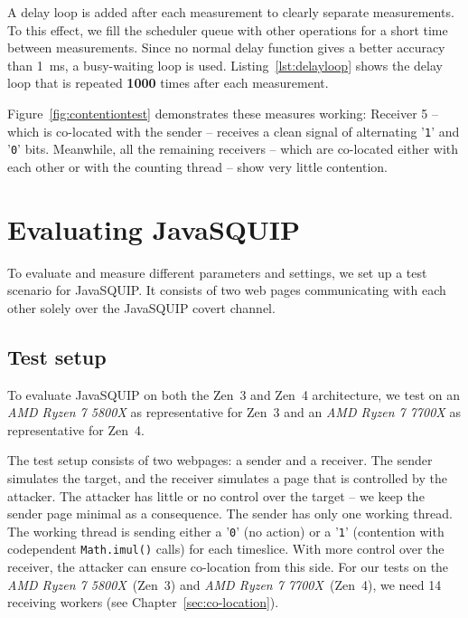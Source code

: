 \documentclass[11pt,
  titlepage=false,
  parskip=half,      %
]{scrreprt}
\begin{document}
A delay loop is added after each measurement to clearly separate measurements.
To this effect, we fill the scheduler queue with other operations for a short time between measurements.
Since no normal delay function gives a better accuracy than 1~ms, a busy-waiting loop is used.
Listing~\ref{lst:delayloop} shows the delay loop that is repeated \textbf{1000} times after each measurement.


Figure~\ref{fig:contentiontest} demonstrates these measures working:
Receiver 5 -- which is co-located with the sender -- receives a clean signal of alternating '\texttt{1}' and '\texttt{0}' bits.
Meanwhile, all the remaining receivers -- which are co-located either with each other or with the counting thread -- show very little contention.


\chapter{Evaluating JavaSQUIP}
\label{ch:evaluation}

To evaluate and measure different parameters and settings, we set up a test scenario for JavaSQUIP.
It consists of two web pages communicating with each other solely over the JavaSQUIP covert channel.

\section {Test setup}
\label{sec:testsetup}
To evaluate JavaSQUIP on both the Zen~3 and Zen~4 architecture,
we test on an \textit{AMD Ryzen 7 5800X} as representative for Zen~3 and an \textit{AMD Ryzen 7 7700X} as representative for Zen~4.

The test setup consists of two webpages: a sender and a receiver.
The sender simulates the target, and the receiver simulates a page that is controlled by the attacker.
The attacker has little or no control over the target -- we keep the sender page minimal as a consequence.
The sender has only one working thread.
The working thread is sending either a '\texttt{0}' (no action) or a '\texttt{1}' (contention with codependent \texttt{Math.imul()} calls) for each timeslice.
With more control over the receiver, the attacker can ensure co-location from this side.
For our tests on the \textit{AMD Ryzen 7 5800X}~(Zen~3) and \textit{AMD Ryzen 7 7700X}~(Zen~4), we need 14 receiving workers (see Chapter~\ref{sec:co-location}).
\end{document}
